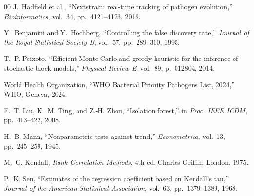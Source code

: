 \documentclass[conference]{IEEEtran}
\begin{document}
\begin{thebibliography}{00}
J.~Hadfield et al., ``Nextstrain: real-time tracking of pathogen evolution,''
\textit{Bioinformatics}, vol.~34, pp.~4121--4123, 2018.

Y.~Benjamini and Y.~Hochberg, ``Controlling the false discovery rate,''
\textit{Journal of the Royal Statistical Society B}, vol.~57, pp.~289--300, 1995.

T.~P. Peixoto, ``Efficient Monte Carlo and greedy heuristic for the
inference of stochastic block models,''
\textit{Physical Review E}, vol.~89, p.~012804, 2014.

World Health Organization, ``WHO Bacterial Priority Pathogens List, 2024,''
WHO, Geneva, 2024.

F.~T. Liu, K.~M. Ting, and Z.-H. Zhou, ``Isolation forest,''
in \textit{Proc. IEEE ICDM}, pp.~413--422, 2008.

H.~B. Mann, ``Nonparametric tests against trend,''
\textit{Econometrica}, vol.~13, pp.~245--259, 1945.

M.~G. Kendall, \textit{Rank Correlation Methods}, 4th ed.
Charles Griffin, London, 1975.

P.~K. Sen, ``Estimates of the regression coefficient based on Kendall's
tau,'' \textit{Journal of the American Statistical Association}, vol.~63,
pp.~1379--1389, 1968.

\end{thebibliography}
\end{document}
